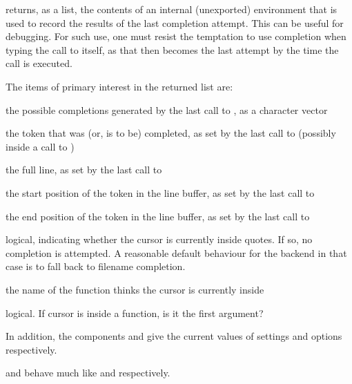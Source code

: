 \begin{Value}
 returns, as a list, the contents of an internal
(unexported) environment that is used to record the results of the
last completion attempt.  This can be useful for debugging.  For such
use, one must resist the temptation to use completion when typing the
call to  itself, as that then becomes the last attempt
by the time the call is executed.

The items of primary interest in the returned list are:

\begin{ldescription}
\item[\code{comps}]  the possible completions generated by the last
call to , as a character vector 
\item[\code{token}]  the token that was (or, is to be) completed, as
set by the last call to  (possibly inside a call
to ) 
\item[\code{linebuffer}]  the full line, as set by the last call to
\item[\code{start}]  the start position of the token in the line
buffer, as set by the last call to  
\item[\code{end}]  the end position of the token in the line
buffer, as set by the last call to  
\item[\code{fileName}]  logical, indicating whether the cursor is
currently inside quotes.  If so, no completion is attempted.  A
reasonable default behaviour for the backend in that case is to fall
back to filename completion.  
\item[\code{fguess}]  the name of the function  thinks
the cursor is currently inside 
\item[\code{isFirstArg}]  logical.  If cursor is inside a function, is it the
first argument? 

\end{ldescription}
In addition, the components  and  give
the current values of settings and options respectively.

 and  behave much like
 and  respectively.
\end{Value}
%
